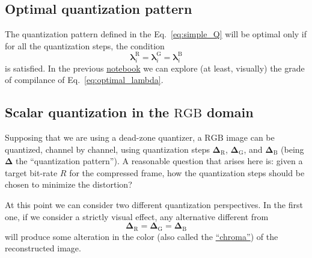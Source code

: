 \subsection{Optimal quantization pattern}
\label{sec:optimal_RD}
The quantization pattern defined in the Eq.~\eqref{eq:simple_Q} will
be optimal only if for all the quantization steps, the condition
\begin{equation}
  \mathbf{\lambda}^{\text{R}}_i = \mathbf{\lambda}^{\text{G}}_i =
  \mathbf{\lambda}^{\text{B}}_i
  \label{eq:optimal_lambda}
\end{equation}
is satisfied. In the previous
\href{https://github.com/Sistemas-Multimedia/Sistemas-Multimedia.github.io/blob/master/contents/RGB_SQ/RGB_SQ.ipynb}{notebook}
we can explore (at least, visually) the grade of compilance of
Eq.~\eqref{eq:optimal_lambda}.

\subsection{Scalar quantization in the $\text{RGB}$ domain}

Supposing that we are using a dead-zone quantizer, a $\text{RGB}$
image can be quantized, channel by channel, using quantization steps
$\mathbf{\Delta}_{\text{R}}$, $\mathbf{\Delta}_{\text{G}}$, and
$\mathbf{\Delta}_{\text{B}}$ (being $\mathbf{\Delta}$ the
``quantization pattern''). A reasonable question that arises here is:
given a target bit-rate $R$ for the compressed frame, how the
quantization steps should be chosen to minimize the distortion?

At this point we can consider two different quantization
perspectives. In the first one, if we consider a strictly visual
effect, any alternative different from
\begin{equation}
  \mathbf{\Delta}_{\text{R}} = \mathbf{\Delta}_{\text{G}} = \mathbf{\Delta}_{\text{B}}
  \label{eq:simple_Q}
\end{equation}
will produce some alteration in the color (also called the
\href{https://en.wikipedia.org/wiki/Chrominance}{``chroma''}) of the
reconstructed image.

